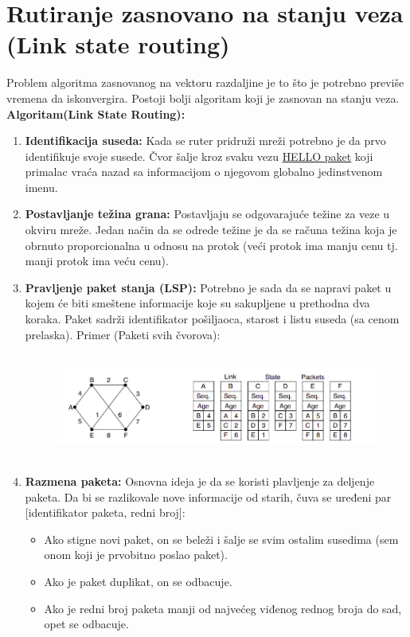 \documentclass[a4paper]{article}
\begin{document}
\section{Rutiranje zasnovano na stanju veza (Link state routing)}
    Problem algoritma zasnovanog na vektoru razdaljine je to što je potrebno previše vremena
    da iskonvergira. Postoji bolji algoritam koji je zasnovan na stanju veza.\\
    \noindent \textbf{Algoritam(Link State Routing):}
    \begin{enumerate}
        \item \textbf{Identifikacija suseda:} Kada se ruter pridruži mreži potrebno je da prvo
              identifikuje svoje susede. Čvor šalje kroz svaku vezu \underline{HELLO paket} koji primalac
              vraća nazad sa informacijom o njegovom globalno jedinstvenom imenu. 
        \item \textbf{Postavljanje težina grana:} Postavljaju se odgovarajuće težine za
              veze u okviru mreže. Jedan način da se odrede težine je da se računa težina koja je obrnuto
              proporcionalna u odnosu na protok (veći protok ima manju cenu tj. manji protok
              ima veću cenu).
        \item \textbf{Pravljenje paket stanja (LSP):} Potrebno je sada da se napravi paket 
              u kojem će biti smeštene informacije koje su sakupljene u prethodna dva koraka.
              Paket sadrži identifikator pošiljaoca, starost i listu suseda (sa cenom prelaska).
              Primer (Paketi svih čvorova):
              \begin{figure}[H]
                \begin{center}
                    \includegraphics[width=120mm,height=35mm]{Slike/rzsv1.png}
                \end{center}
              \end{figure}
        \item \textbf{Razmena paketa:} Osnovna ideja je da se koristi plavljenje za deljenje
              paketa. Da bi se razlikovale nove informacije od starih, čuva se uređeni par
              [identifikator paketa, redni broj]:
              \begin{itemize}
                \item Ako stigne novi paket, on se beleži i šalje
                      se svim ostalim susedima (sem onom koji je prvobitno poslao paket). 
                \item Ako je paket duplikat, on se odbacuje. 
                \item Ako je redni broj paketa manji od najvećeg viđenog rednog broja do sad,
                      opet se odbacuje. 
              \end{itemize}


\end{enumerate}
\end{document}
